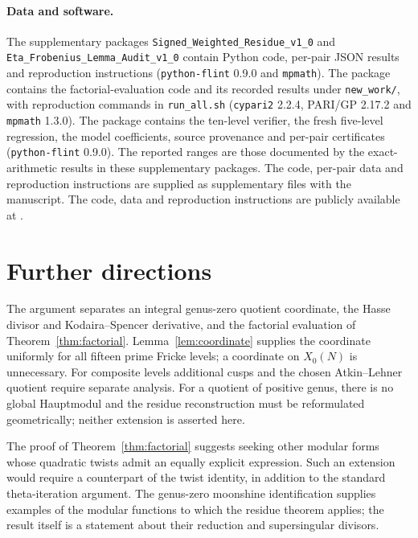 \documentclass[11pt,a4paper]{article}
\numberwithin{equation}{section}
\theoremstyle{definition}
\theoremstyle{remark}
\newcommand{\DataRepositoryURL}{}
\begin{document}
\paragraph{Data and software.}
The supplementary packages \texttt{Signed\_Weighted\_Residue\_v1\_0} and
\texttt{Eta\_Frobenius\_Lemma\_Audit\_v1\_0} contain Python code, per-pair JSON
results and reproduction instructions (\texttt{python-flint} 0.9.0 and
\texttt{mpmath}). The package 
contains the factorial-evaluation code and its recorded results under
\texttt{new\_work/}, with reproduction commands in \texttt{run\_all.sh}
(\texttt{cypari2} 2.2.4, PARI/GP 2.17.2 and \texttt{mpmath} 1.3.0).
The package  contains the
ten-level verifier, the fresh five-level regression, the model coefficients,
source provenance and per-pair certificates (\texttt{python-flint} 0.9.0).
The reported ranges are those documented by the exact-arithmetic results
in these supplementary packages.
\if\relax\detokenize\expandafter{\DataRepositoryURL}\relax
The code, per-pair data and reproduction instructions are supplied as
supplementary files with the manuscript.
\else
The code, data and reproduction instructions are publicly available at
\expandafter\url\expandafter{\DataRepositoryURL}.
\fi

\section{Further directions}
The argument separates an integral genus-zero quotient coordinate, the
Hasse divisor and Kodaira--Spencer derivative, and the factorial
evaluation of Theorem~\ref{thm:factorial}.
Lemma~\ref{lem:coordinate} supplies the coordinate uniformly for all
fifteen prime Fricke levels; a coordinate on $X_0(N)$ is unnecessary.
For composite levels additional cusps and the chosen Atkin--Lehner
quotient require separate analysis. For a quotient of positive genus,
there is no global Hauptmodul and the residue reconstruction must be
reformulated geometrically; neither extension is asserted here.

The proof of Theorem~\ref{thm:factorial} suggests seeking other modular
forms whose quadratic twists admit an equally explicit expression.
Such an extension would require a counterpart of the twist identity,
in addition to the standard theta-iteration argument. The genus-zero
moonshine identification supplies examples of the modular functions
to which the residue theorem applies; the result itself is a statement
about their reduction and supersingular divisors.
\end{document}
